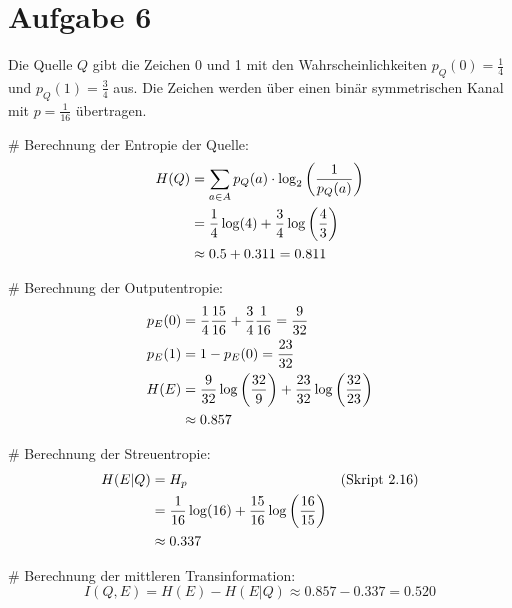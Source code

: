 

\section*{Aufgabe 6}
Die Quelle $Q$ gibt die Zeichen 0 und 1 mit den Wahrscheinlichkeiten $p_Q(0) = \frac{1}{4}$ und $p_Q(1) = \frac{3}{4}$ aus.
Die Zeichen werden über einen binär symmetrischen Kanal mit $p = \frac{1}{16}$ übertragen.
\medskip
\begin{myList}

# Berechnung der Entropie der Quelle:
\begin{align*} 
H(Q) 
  &= \sum_{a\in A} p_Q(a)\cdot\log_2\left( \frac 1 {p_Q(a)} \right) \\
  &= \frac 1 4\log(4) + \frac 3 4\log\left( \frac 4 3 \right) \\
  &\approx 0.5+0.311=0.811
\end{align*}

# Berechnung der Outputentropie:
\begin{align*}
p_E(0) &= \frac 1 4\frac{15}{16} + \frac 3 4\frac 1 {16} = \frac 9{32}\\
p_E(1) &= 1 - p_E(0) = \frac{23}{32}\\
H(E) &= \frac{9}{32}\log\left( \frac{32}{9} \right) + \frac{23}{32}\log\left( \frac{32}{23} \right)\\
&\approx 0.857
\end{align*}

# Berechnung der Streuentropie:
\begin{align*}
H(E|Q)&=H_p&&\text{(Skript 2.16)}\\
&= \frac 1 {16}\log(16) + \frac{15}{16}\log\left( \frac{16}{15} \right)\\
&\approx 0.337
\end{align*}

# Berechnung der mittleren Transinformation:
$$I(Q, E) = H(E) - H(E|Q) \approx 0.857 - 0.337 = 0.520$$ 

\end{myList}

